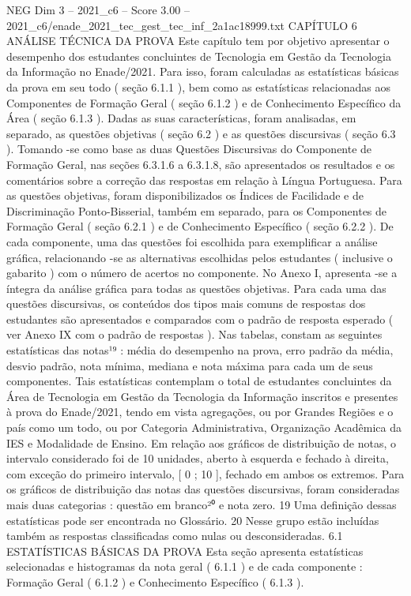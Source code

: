 \begin{textsample}{NEG Dim 3 – 2021\_c6 – Score 3.00 – 2021\_c6/enade\_2021\_tec\_gest\_tec\_inf\_2a1ac18999.txt}  \label{ex:f3_neg_243}
CAPÍTULO 6 ANÁLISE TÉCNICA DA PROVA Este capítulo tem por objetivo apresentar o desempenho dos estudantes concluintes de Tecnologia em Gestão da Tecnologia da Informação no Enade/2021.
Para isso, foram calculadas as estatísticas básicas da prova em seu todo ( seção 6.1.1 ), bem como as estatísticas relacionadas aos Componentes de Formação Geral ( seção 6.1.2 ) e de Conhecimento Específico da Área ( seção 6.1.3 ).
Dadas as suas características, foram analisadas, em separado, as questões objetivas ( seção 6.2 ) e as questões discursivas ( seção 6.3 ).
Tomando -se como base as duas Questões Discursivas do Componente de Formação Geral, nas seções 6.3.1.6 a 6.3.1.8, são apresentados os resultados e os comentários sobre a correção das respostas em relação à Língua Portuguesa.
Para as questões objetivas, foram disponibilizados os Índices de Facilidade e de Discriminação Ponto-Bisserial, também em separado, para os Componentes de Formação Geral ( seção 6.2.1 ) e de Conhecimento Específico ( seção 6.2.2 ).
De cada componente, uma das questões foi escolhida para exemplificar a análise gráfica, relacionando -se as alternativas escolhidas pelos estudantes ( inclusive o gabarito ) com o número de acertos no componente.
No Anexo I, apresenta -se a íntegra da análise gráfica para todas as questões objetivas.
Para cada uma das questões discursivas, os conteúdos dos tipos mais comuns de respostas dos estudantes são apresentados e comparados com o padrão de resposta esperado ( ver Anexo IX com o padrão de respostas ).
Nas tabelas, constam as seguintes estatísticas das notas¹⁹ : média do desempenho na prova, erro padrão da média, desvio padrão, nota mínima, mediana e nota máxima para cada um de seus componentes.
Tais estatísticas contemplam o total de estudantes concluintes da Área de Tecnologia em Gestão da Tecnologia da Informação inscritos e presentes à prova do Enade/2021, tendo em vista agregações, ou por Grandes Regiões e o país como um todo, ou por Categoria Administrativa, Organização Acadêmica da IES e Modalidade de Ensino.
Em relação aos gráficos de distribuição de notas, o intervalo considerado foi de 10 unidades, aberto à esquerda e fechado à direita, com exceção do primeiro intervalo, [ 0 ; 10 ], fechado em ambos os extremos.
Para os gráficos de distribuição das notas das questões discursivas, foram consideradas mais duas categorias : questão em branco²⁰ e nota zero. 19 Uma definição dessas estatísticas pode ser encontrada no Glossário. 20 Nesse grupo estão incluídas também as respostas classificadas como nulas ou desconsideradas. 6.1 ESTATÍSTICAS BÁSICAS DA PROVA Esta seção apresenta estatísticas selecionadas e histogramas da nota geral ( 6.1.1 ) e de cada componente : Formação Geral ( 6.1.2 ) e Conhecimento Específico ( 6.1.3 ).

\end{textsample}
